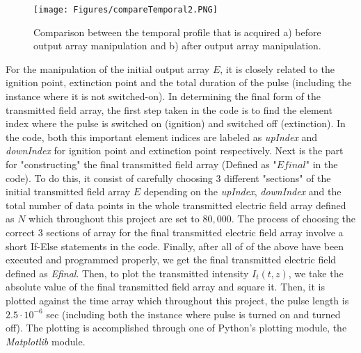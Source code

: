 \begin{figure}
    \centering
    \texttt{[image: Figures/compareTemporal2.PNG]}
    \caption[Comparison of The Temporal Profile of The Transmitted Intensity Before and After Array Modification]{Comparison between the temporal profile that is acquired a) before output array manipulation and b) after output array manipulation.}
    \label{fig: compare temporal}
\end{figure}

For the manipulation of the initial output array $E$, it is closely related to the ignition point, extinction point and the total duration of the pulse (including the instance where it is not switched-on). In determining the final form of the transmitted field array, the first step taken in the code is to find the element index where the pulse is switched on (ignition) and switched off (extinction). In the code, both this important element indices are labeled as \textit{upIndex} and \textit{downIndex} for ignition point and extinction point respectively. Next is the part for "constructing" the final transmitted field array (Defined as "$Efinal$" in the code). To do this, it consist of carefully choosing 3 different "sections" of the initial transmitted field array $E$ depending on the \textit{upIndex}, \textit{downIndex} and the total number of data points in the whole transmitted electric field array defined as $N$ which throughout this project are set to $80,000$. The process of choosing the correct 3 sections of array for the final transmitted electric field array involve a short If-Else statements in the code. Finally, after all of of the above have been executed and programmed properly, we get the final transmitted electric field defined as \textit{Efinal}. Then, to plot the transmitted intensity $I_{t}(t, z)$, we take the absolute value of the final transmitted field array and square it. Then, it is plotted against the time array which throughout this project, the pulse length is $2.5 \cdot 10^{-6}$ sec (including both the instance where pulse is turned on and turned off). The plotting is accomplished through one of Python's plotting module, the \textit{Matplotlib} module.

